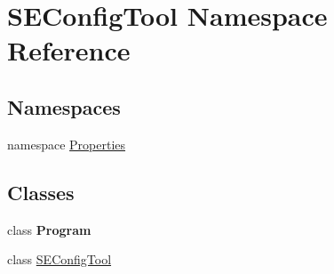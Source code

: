 \hypertarget{namespace_s_e_config_tool}{}\section{S\+E\+Config\+Tool Namespace Reference}
\label{namespace_s_e_config_tool}
\subsection*{Namespaces}
\begin{DoxyCompactItemize}
\item 
namespace \hyperlink{namespace_s_e_config_tool_1_1_properties}{Properties}
\end{DoxyCompactItemize}
\subsection*{Classes}
\begin{DoxyCompactItemize}
\item 
class {\bfseries Program}
\item 
class \hyperlink{class_s_e_config_tool_1_1_s_e_config_tool}{S\+E\+Config\+Tool}
\end{DoxyCompactItemize}
